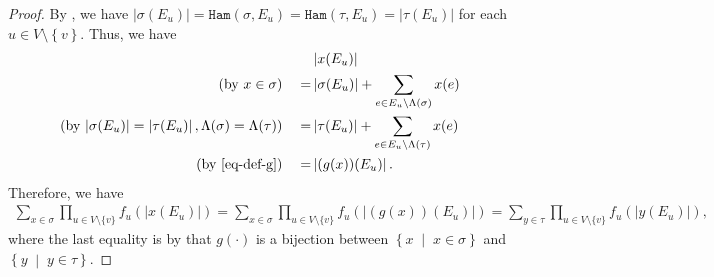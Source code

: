 \documentclass[11pt]{article}
\newcommand{\abs}[1]{\left\vert#1\right\vert}
\newcommand{\set}[1]{\left\{#1\right\}}
\renewcommand{\mid}{\;\middle\vert\;} \newcommand{\cmid}{\,:\,}
\def\!#1{\mathtt{#1}}
\newcommand{\Ham}{\!{Ham}}
\begin{document}
\begin{proof}
    By , we have $\abs{\sigma(E_u)} = \Ham(\sigma, E_u) = \Ham(\tau, E_u) = \abs{\tau(E_u)}$ for each $u \in V \setminus \set{v}$.
     Thus, we have
     \begin{equation*}
      \begin{aligned}\label{eq-xemu-eq-gxemu}
   & \abs{x(E_u)} \\
\left(\text{by $x\in \sigma$}\right) \quad   = &\abs{\sigma(E_u)} + \sum_{e\in E_u\setminus \Lambda(\sigma)}x(e) \\
\left(\text{by $\abs{\sigma(E_u)} = \abs{\tau(E_u)}, \Lambda(\sigma) = \Lambda(\tau)$}\right) \quad  = & \abs{\tau(E_u)} + \sum_{e\in E_u\setminus \Lambda(\tau)}x(e) \\
\left(\text{by \eqref{eq-def-g}}\right) \quad  = & \abs{(g(x))(E_u)}.
    \end{aligned}
    \end{equation*}
    Therefore, we have 
    \begin{align}\label{eq-mapping-g}
            \sum_{x\in \sigma} \prod_{u \in V\setminus \{v\}} f_u\left(\abs{x ({E_u})}\right)            =\sum_{x\in \sigma} \prod_{u \in V\setminus \{v\}} f_u\left(\abs{(g(x))({E_u})}\right)
            =\sum_{y\in \tau} \prod_{u \in V\setminus \{v\}} f_u\left(\abs{y({E_u})}\right),
        \end{align}
    where the last equality is by that $g(\cdot)$ is a bijection between $\left\{x\mid x\in \sigma\right\}$ and $\left\{y\mid y\in \tau\right\}$.
    

\end{proof}
\end{document}
